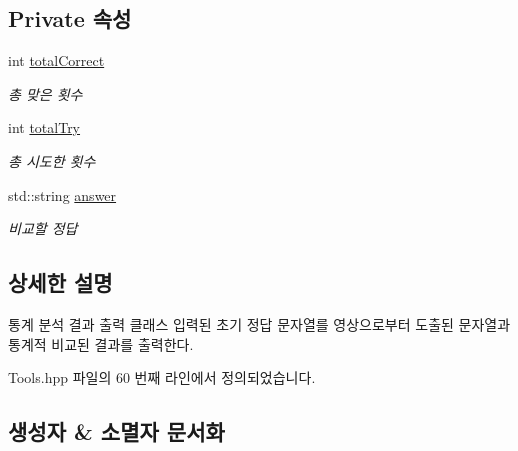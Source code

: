 \subsection*{Private 속성}
\begin{DoxyCompactItemize}
\item 
\mbox{\label{classtools_1_1_analyzer_a8a38c47fc2d716a805f026dea1ea2868}} 
int \hyperlink{classtools_1_1_analyzer_a8a38c47fc2d716a805f026dea1ea2868}{total\+Correct}
\begin{DoxyCompactList}\small\item\em 총 맞은 횟수 \end{DoxyCompactList}\item 
\mbox{\label{classtools_1_1_analyzer_a3e378819a8a7d97b4cffb83cd2cde912}} 
int \hyperlink{classtools_1_1_analyzer_a3e378819a8a7d97b4cffb83cd2cde912}{total\+Try}
\begin{DoxyCompactList}\small\item\em 총 시도한 횟수 \end{DoxyCompactList}\item 
\mbox{\label{classtools_1_1_analyzer_a266409271441e355f817ffe0ffd59250}} 
std\+::string \hyperlink{classtools_1_1_analyzer_a266409271441e355f817ffe0ffd59250}{answer}
\begin{DoxyCompactList}\small\item\em 비교할 정답 \end{DoxyCompactList}\end{DoxyCompactItemize}


\subsection{상세한 설명}
통계 분석 결과 출력 클래스 입력된 초기 정답 문자열를 영상으로부터 도출된 문자열과 통계적 비교된 결과를 출력한다. 

Tools.\+hpp 파일의 60 번째 라인에서 정의되었습니다.



\subsection{생성자 \& 소멸자 문서화}
\mbox{\label{classtools_1_1_analyzer_a6510bc1e10d40e671db16b7a91fc8fac}} 
